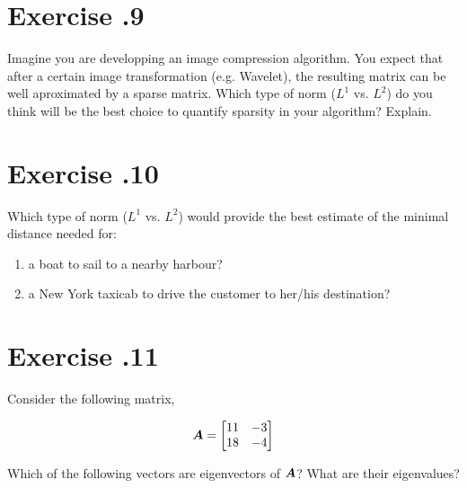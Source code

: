 \documentclass{article}
\begin{document}
\section*{Exercise \chapnumber.9}
Imagine you are developping an image compression algorithm. You expect that after a certain image transformation (e.g. Wavelet), the resulting matrix can be well aproximated by a sparse matrix. Which type of norm ($\textit{L}^{1}$ vs. $\textit{L}^{2}$) do you think will be the best choice to quantify sparsity in your algorithm? Explain.

\section*{Exercise \chapnumber.10}

Which type of norm ($\textit{L}^{1}$ vs. $\textit{L}^{2}$) would provide the best estimate of the minimal distance needed for:

\begin{enumerate}[label=(\alph*)]
\item a boat to sail to a nearby harbour?

\item a New York taxicab to drive the customer to her/his destination?
\end{enumerate}

\section*{Exercise \chapnumber.11}

Consider the following matrix,

\begin{equation}
{\bm{A}}
=
\begin{bmatrix}
    11 & -3\\
    18 & -4
\end{bmatrix}
\end{equation}

Which of the following vectors are eigenvectors of ${\bm{A}}$? What are their eigenvalues?
\end{document}

